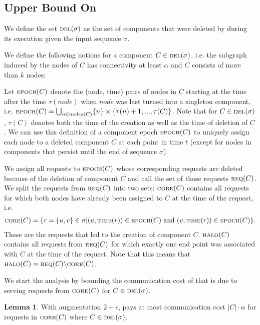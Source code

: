 \documentclass[a4paper,xcolor=dvipsnames, tikz, 12pt]{article}
\newcommand{\crep}{\text{C{\scriptsize REP}}}
\newcommand{\del}{\text{\scriptsize DEL}}
\newcommand{\core}{\text{\scriptsize CORE}}
\newcommand{\halo}{\text{\scriptsize HALO}}
\newcommand{\req}{\text{\scriptsize REQ}}
\newcommand{\epoch}{\text{\scriptsize EPOCH}}
\newcommand{\reqTime}{\text{\scriptsize TIME}}
\theoremstyle{definition}
\newtheorem{lemma}[defi]{Lemma}
\begin{document}
\subsection{Upper Bound On \crep{}}

We define the set $\del(\sigma)$ as the set of components that were deleted by \crep{} during its execution given the input sequence $\sigma$.

We define the following notions for a component $C\in\del{}(\sigma)$, i.e. the subgraph induced by the nodes of $C$ has connectivity at least $\alpha$ and $C$ consists of more than $k$ nodes:

Let $\epoch{}(C)$ denote the (node, time) pairs of nodes in $C$ starting at the time after the time $\tau(node)$ when $node$ was last turned into a singleton component, i.e. $\epoch{}(C)=\bigcup_{n\in nodes(C)}\{n\}\times\{\tau(n)+1,...,\tau(C)\}$. Note that for $C\in\del(\sigma)$, $\tau(C)$ denotes both the time of the creation as well as the time of deletion of $C$. We can use this definition of a component epoch $\epoch(C)$ to uniquely assign each node to a deleted component $C$ at each point in time $t$ (except for nodes in components that persist until the end of sequence $\sigma$).

We assign all requests to $\epoch(C)$ whose corresponding requests are deleted because of the deletion of component $C$ and call the set of those requests $\req(C)$.
We split the requests from $\req{}(C)$ into two sets: $\core(C)$ contains all requests for which both nodes have already been assigned to $C$ at the time of the request, i.e. 
\begin{align*}
\core(C)=\{r=\{u,v\}\in\sigma| (u,\reqTime(r))\in \epoch(C)\text{ and } (v, \reqTime(r))\in \epoch(C)\}.
\end{align*}
These are the requests that led to the creation of component $C$. 
$\halo(C)$ contains all requests from $\req(C)$ for which exactly one end point was associated with $C$ at the time of the request. Note that this means that $\halo(C)=\req(C)\backslash \core(C)$.

We start the analysis by bounding the communication cost of \crep{} that is due to serving requests from $\core(C)$ for $C\in\del{}(\sigma)$.

\begin{lemma}
	\label{core_comm_upper}
	With augmentation $2+\epsilon$, \crep{} pays at most communication cost $|C|\cdot\alpha$ for requests in $\core(C)$ where $C\in\del{}(\sigma)$.
\end{lemma}
\end{document}
